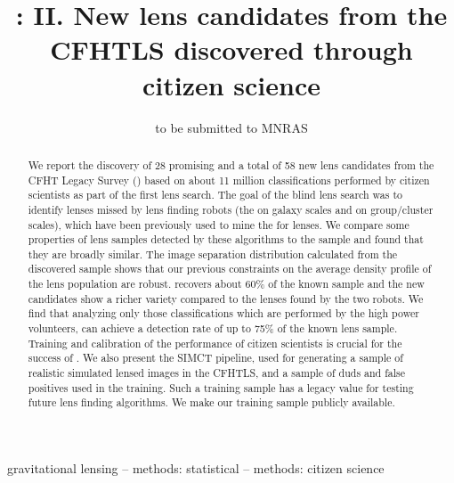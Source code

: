 \documentclass[useAMS,usenatbib,a4paper]{mn2e}
\title[\sw II]
{\SW: II. New lens candidates from the CFHTLS discovered
through citizen science}
\author[More et al.]{%
 
}
\begin{document}
\date{to be submitted to MNRAS}
\pagerange{\pageref{firstpage}--\pageref{lastpage}}

\maketitle

\label{firstpage}


\begin{abstract}

We report the discovery of 28 promising and a total of 58 new lens
candidates from the CFHT Legacy Survey (\cfhtls) based on about 11
million classifications performed by citizen scientists as part of the
first \sw lens search.  The goal of the blind lens search was to
identify lenses missed by lens finding robots (the \rf on galaxy scales
and \af on group/cluster scales), which have been previously used to
mine the \cfhtls for lenses.  We compare some properties of lens samples
detected by these algorithms to the \sw sample and found that they are
broadly similar.  The image separation distribution calculated from the
\sw discovered sample shows that our previous constraints on the average
density profile of the lens population are robust. \sw recovers about
60\% of the known sample and the new candidates show a richer variety
compared to the lenses found by the two robots. We find that analyzing
only those classifications which are performed by the high power
volunteers, \sw can achieve a detection rate of up to 75\% of the known
lens sample.  Training and calibration of the performance of citizen
scientists is crucial for the success of \sw. We also present the SIMCT
pipeline, used for generating a sample of realistic simulated lensed
images in the CFHTLS, and a sample of duds and false positives used in
the training.  Such a training sample has a legacy value for testing
future lens finding algorithms. We make our training sample publicly
available.

\end{abstract}


\begin{keywords}
  gravitational lensing   --
  methods: statistical    --
  methods: citizen science
\end{keywords}
\end{document}
